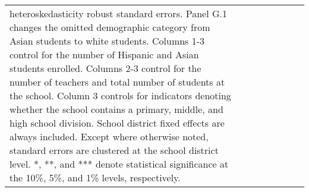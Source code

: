 \begin{center}
\begin{footnotesize}
\begin{longtable}{lccccccc}
heteroskedasticity robust standard errors. Panel G.1 changes the omitted demographic category from Asian students to white students. Columns 1-3 control for the number of Hispanic and Asian students enrolled. Columns 2-3 control for the number of teachers and total number of students at the school. Column 3 controls for indicators denoting whether the school contains a primary, middle, and high school division. School district fixed effects are always included. Except where otherwise noted, standard errors are clustered at the school district level. *, **, and *** denote statistical significance at the 10\%, 5\%, and 1\% levels, respectively.}
\end{longtable}
\end{footnotesize}
\end{center}

